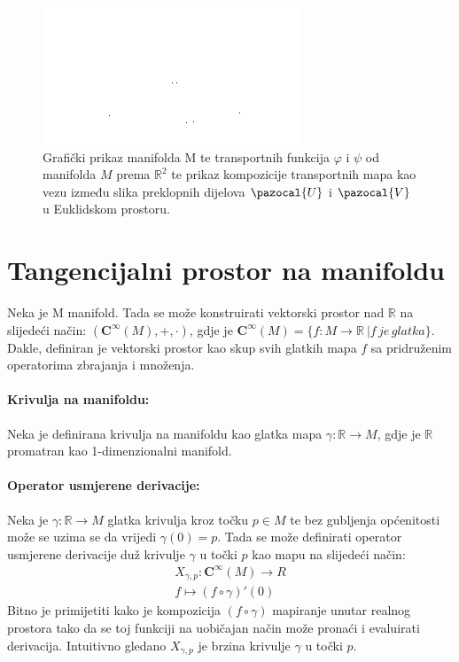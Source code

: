 \documentclass[times, utf8, diplomski]{fer}
\newcommand{\Va}{\pazocal{V}}
\newcommand{\Ua}{\pazocal{U}}
\begin{document}
	\begin{figure}[h]
		\includegraphics[width=\textwidth]{fig_overlap_charts.png}
		\caption{Grafički prikaz manifolda M te transportnih funkcija $\varphi$ i $\psi$ od manifolda $M$ prema $\mathbb{R}^2$ te prikaz kompozicije transportnih mapa kao vezu između slika preklopnih dijelova $\Ua$ i $\Va$ u Euklidskom prostoru.}
	\end{figure}

\section{Tangencijalni prostor na manifoldu}

	Neka je M manifold. Tada se može konstruirati vektorski prostor nad $\mathbb{R}$ na slijedeći način: $(\boldsymbol{C}^\infty(M), +, \cdot)$, gdje je $\boldsymbol{C}^\infty(M) = \{ f: M \rightarrow \mathbb{R} \ | f \,je\, glatka\}$. Dakle, definiran je vektorski prostor kao skup svih glatkih mapa $f$ sa pridruženim operatorima zbrajanja i množenja. 
	
	\paragraph{Krivulja na manifoldu:} Neka je definirana krivulja na manifoldu kao glatka mapa $\gamma:\mathbb{R} \rightarrow M$, gdje je $\mathbb{R}$ promatran kao 1-dimenzionalni manifold.
	
	\paragraph{Operator usmjerene derivacije:} Neka je $\gamma: \mathbb{R} \rightarrow M$ glatka krivulja kroz točku $p\in M$ te bez gubljenja općenitosti može se uzima se da vrijedi $\gamma(0) = p$. Tada se može definirati operator usmjerene derivacije duž krivulje $\gamma$ u točki $p$ kao mapu na slijedeći način: \\
	\begin{gather}
		X_{\gamma, p} : \boldsymbol{C}^\infty(M) \rightarrow R \\
		f \mapsto (f \circ \gamma)'(0)
	\end{gather}
	Bitno je primijetiti kako je kompozicija $(f \circ \gamma)$ mapiranje unutar realnog prostora tako da se toj funkciji na uobičajan način može pronaći i evaluirati derivacija.
	Intuitivno gledano $X_{\gamma, p}$ je brzina krivulje $\gamma$ u točki $p$.
	
\end{document}

